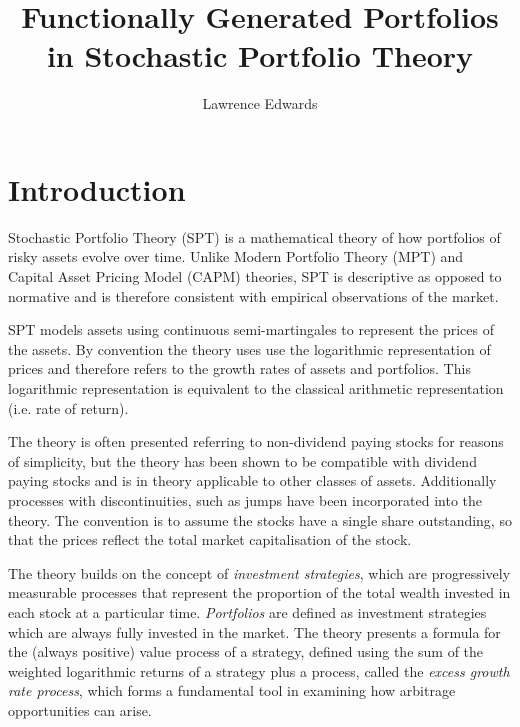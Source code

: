 \documentclass[british]{amsart} \usepackage{lmodern}
\numberwithin{equation}{section} \numberwithin{figure}{section}
\theoremstyle{plain} \newtheorem{thm}{\protect\theoremname}[section]
\theoremstyle{definition} \newtheorem{defn}[thm]{\protect\definitionname}
\theoremstyle{plain} \newtheorem{assumption}[thm]{\protect\assumptionname}
\theoremstyle{plain} \newtheorem{lem}[thm]{\protect\lemmaname}
\theoremstyle{plain} \newtheorem{prop}[thm]{\protect\propositionname}
\theoremstyle{remark} \newtheorem{rem}[thm]{\protect\remarkname}
\theoremstyle{plain} \newtheorem{cor}[thm]{\protect\corollaryname}
\begin{document}
\title{Functionally Generated Portfolios in Stochastic Portfolio Theory}
\author{Lawrence Edwards} \maketitle

\newpage

\tableofcontents{}

\newpage


\section{Introduction}

Stochastic Portfolio Theory (SPT) is a mathematical theory of how portfolios of
risky assets evolve over time. Unlike Modern Portfolio Theory (MPT) and Capital Asset
Pricing Model (CAPM) theories, SPT is descriptive as opposed to normative and is
therefore consistent with empirical observations of the market.

SPT models assets using continuous semi-martingales to represent the prices of
the assets. By convention the theory uses use the logarithmic representation of
prices and therefore refers to the growth rates of assets and portfolios. This
logarithmic representation is equivalent to the classical arithmetic
representation (i.e. rate of return).

The theory is often presented referring to non-dividend paying stocks for
reasons of simplicity, but the theory has been shown to be compatible with
dividend paying stocks and is in theory applicable to other classes of assets.
Additionally processes with discontinuities, such as jumps have been
incorporated into the theory. The convention is to assume the stocks have a
single share outstanding, so that the prices reflect the total market
capitalisation of the stock.

The theory builds on the concept of \textit{investment strategies}, which are
progressively measurable processes that represent the proportion of the total
wealth invested in each stock at a particular time. \textit{Portfolios} are defined as
investment strategies which are always fully invested in the market. The theory
presents a formula for the (always positive) value process of a strategy,
defined using the sum of the weighted logarithmic returns of a strategy plus a
process, called the \textit{excess growth rate process}, which forms a
fundamental tool in examining how arbitrage opportunities can arise.
\end{document}

